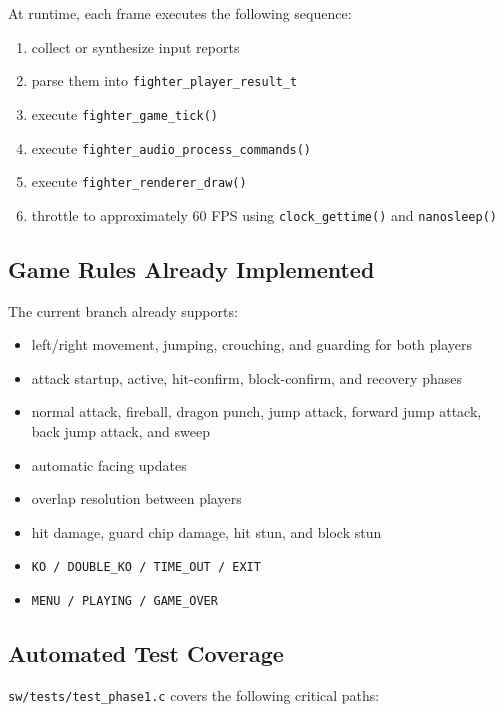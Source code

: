 \documentclass[12pt,a4paper]{article}
\begin{document}
At runtime, each frame executes the following sequence:

\begin{enumerate}
  \item collect or synthesize input reports
  \item parse them into \texttt{fighter\_player\_result\_t}
  \item execute \texttt{fighter\_game\_tick()}
  \item execute \texttt{fighter\_audio\_process\_commands()}
  \item execute \texttt{fighter\_renderer\_draw()}
  \item throttle to approximately 60 FPS using \texttt{clock\_gettime()} and \texttt{nanosleep()}
\end{enumerate}

\subsection{Game Rules Already Implemented}

The current branch already supports:

\begin{itemize}
  \item left/right movement, jumping, crouching, and guarding for both players
  \item attack startup, active, hit-confirm, block-confirm, and recovery phases
  \item normal attack, fireball, dragon punch, jump attack, forward jump attack, back jump attack, and sweep
  \item automatic facing updates
  \item overlap resolution between players
  \item hit damage, guard chip damage, hit stun, and block stun
  \item \texttt{KO / DOUBLE\_KO / TIME\_OUT / EXIT}
  \item \texttt{MENU / PLAYING / GAME\_OVER}
\end{itemize}

\subsection{Automated Test Coverage}

\texttt{sw/tests/test\_phase1.c} covers the following critical paths:
\end{document}
